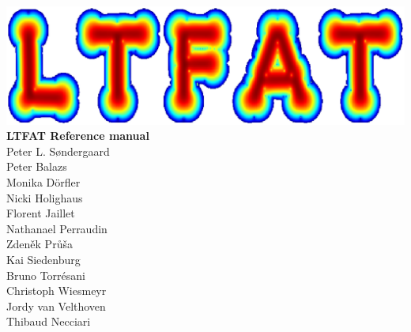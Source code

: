\documentclass[a4paper]{book}
\begin{document}
\begin{titlepage}
\begin{center}
\includegraphics[width=70ex]{frontpage}
\\[0.4cm]
{ \huge \bfseries LTFAT Reference manual}\\[0.4cm]
\large {Peter L. S{\o}ndergaard } \\
\large {Peter Balazs } \\
\large {Monika D{\"o}rfler } \\
\large {Nicki Holighaus } \\ 
\large {Florent Jaillet } \\ 
\large {Nathanael Perraudin} \\
\large {Zden\v{e}k Pr\r{u}\v{s}a} \\
\large {Kai Siedenburg} \\
\large {Bruno Torr{\'e}sani } \\
\large {Christoph Wiesmeyr } \\
\large {Jordy van Velthoven} \\
\large {Thibaud Necciari}


\end{center}

\end{titlepage}

\tableofcontents
















\end{document}
